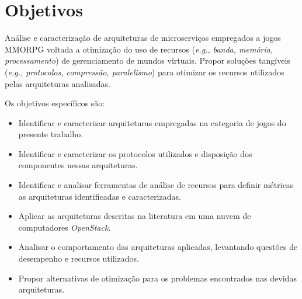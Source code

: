 \section{Objetivos}
\label{obj}

Análise e caracterização de arquiteturas de microserviços empregados a jogos MMORPG voltada a otimização do uso de recursos (\textit{e.g., banda, memória, processamento\cite{1417630}}) de gerenciamento de mundos virtuais. Propor soluções tangíveis (\textit{e.g., protocolos, compressão, paralelismo\cite{1417630}}) para otimizar os recursos utilizados pelas arquiteturas analisadas.

Os objetivos específicos são:
\begin{itemize}
    \item Identificar e caracterizar arquiteturas empregadas na categoria de jogos do presente trabalho.
    \item Identificar e caracterizar os protocolos utilizados e disposição dos componentes nessas arquiteturas.
    \item Identificar e analisar ferramentas de análise de recursos para definir métricas as arquiteturas identificadas e caracterizadas.
    \item Aplicar as arquiteturas descritas na literatura em uma nuvem de computadores \textit{OpenStack}.
    \item Analisar o comportamento das arquiteturas aplicadas, levantando questões de desempenho e recursos utilizados.
    \item Propor alternativas de otimização para os problemas encontrados nas devidas arquiteturas.
\end{itemize}
